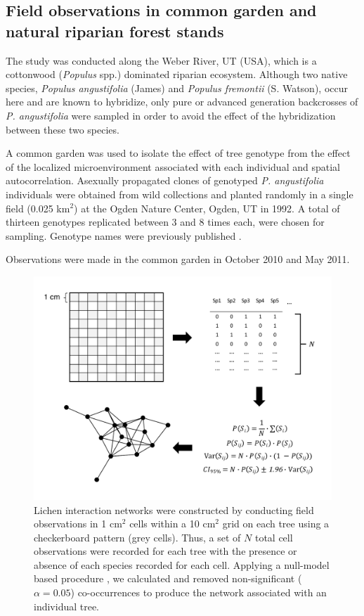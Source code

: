 \documentclass[fleqn,10pt]{wlscirep}
\begin{document}
\subsection*{Field observations in common garden and natural riparian forest stands}

The study was conducted along the Weber River, UT (USA), which is a
cottonwood (\textit{Populus} spp.) dominated riparian
ecosystem. Although two native species, \textit{Populus angustifolia}
(James) and \textit{Populus fremontii} (S. Watson), occur here and are
known to hybridize, only pure or advanced generation backcrosses of
\textit{P. angustifolia} were sampled in order to avoid the effect of
the hybridization between these two species.

A common garden was used to isolate the effect of tree genotype from
the effect of the localized microenvironment associated with each
individual and spatial autocorrelation. Asexually propagated clones of
genotyped \textit{P. angustifolia} individuals were obtained from wild
collections and planted randomly in a single field (0.025 km$^2$) at
the Ogden Nature Center, Ogden, UT in 1992. A total of thirteen
genotypes replicated between 3 and 8 times each, were chosen for
sampling. Genotype names were previously published
\cite{Martinsen}. 

Observations were made in the common garden in October 2010 and May
2011. 


\begin{figure}[ht]
\centering
\includegraphics[width=\linewidth]{conet_method.pdf}
\caption{Lichen interaction networks were constructed by conducting
  field observations in 1 cm$^2$ cells within a 10 cm$^2$ grid on each
  tree using a checkerboard pattern (grey cells). Thus, a set of $N$
  total cell observations were recorded for each tree with the
  presence or absence of each species recorded for each cell. Applying
  a null-model based procedure \cite{Araujo2011}, we calculated and
  removed non-significant ($\alpha = 0.05$) co-occurrences to produce
  the network associated with an individual tree.}
\label{fig:conet_method}
\end{figure}
\end{document}
